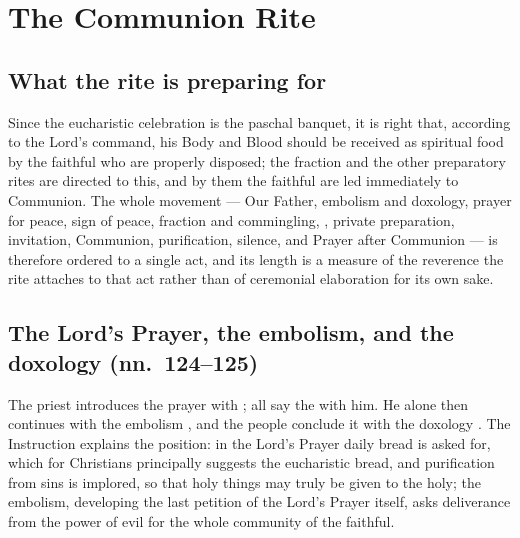 \section{The Communion Rite}

\subsection{What the rite is preparing for}

Since the eucharistic celebration is the paschal banquet, it is right that, according to the
Lord's command, his Body and Blood should be received as spiritual food by the faithful who are
properly disposed; the fraction and the other preparatory rites are directed to this, and by
them the faithful are led immediately to Communion. The whole movement --- Our Father, embolism
and doxology, prayer for peace, sign of peace, fraction and commingling, ,
private preparation, invitation, Communion, purification, silence, and Prayer after Communion
--- is therefore ordered to a single act, and its length is a measure of the reverence the rite
attaches to that act rather than of ceremonial elaboration for its own sake.

\subsection{The Lord's Prayer, the embolism, and the doxology (nn.\ 124--125)}

The priest introduces the prayer with ; all say the  with him. He alone then
continues with the embolism , and the
people conclude it with the doxology . The Instruction explains the position: in the Lord's Prayer daily
bread is asked for, which for Christians principally suggests the eucharistic bread, and
purification from sins is implored, so that holy things may truly be given to the holy; the
embolism, developing the last petition of the Lord's Prayer itself, asks deliverance from the
power of evil for the whole community of the faithful.

